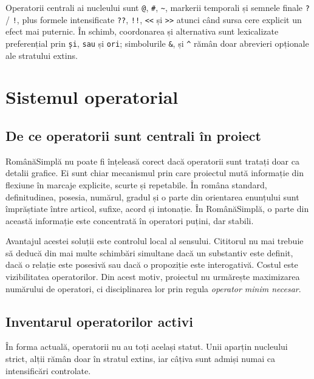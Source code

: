 \documentclass[12pt,onecolumn,letterpaper]{article}
\newcommand{\rs}[1]{\texttt{#1}}
\begin{document}
Operatorii centrali ai nucleului sunt \rs{@}, \rs{\#}, \rs{\textasciitilde{}}, markerii
temporali și semnele finale \rs{?} / \rs{!}, plus formele intensificate
\rs{??}, \rs{!!}, \rs{<<} și \rs{>>} atunci când sursa cere explicit un efect
mai puternic. În schimb, coordonarea și alternativa sunt lexicalizate
preferențial prin \rs{și}, \rs{sau} și \rs{ori}; simbolurile \rs{\&}, \rs{\textbar{}}
și \rs{\textasciicircum{}} rămân doar abrevieri opționale ale stratului extins.

\section{Sistemul operatorial}

\subsection{De ce operatorii sunt centrali în proiect}

RomânăSimplă nu poate fi înțeleasă corect dacă operatorii sunt tratați doar ca
detalii grafice. Ei sunt chiar mecanismul prin care proiectul mută informație
din flexiune în marcaje explicite, scurte și repetabile. În româna standard,
definitudinea, posesia, numărul, gradul și o parte din orientarea enunțului sunt
împrăștiate între articol, sufixe, acord și intonație. În RomânăSimplă, o parte
din această informație este concentrată în operatori puțini, dar stabili.

Avantajul acestei soluții este controlul local al sensului. Cititorul nu mai
trebuie să deducă din mai multe schimbări simultane dacă un substantiv este
definit, dacă o relație este posesivă sau dacă o propoziție este interogativă.
Costul este vizibilitatea operatorilor. Din acest motiv, proiectul nu urmărește
maximizarea numărului de operatori, ci disciplinarea lor prin regula
\textit{operator minim necesar}.

\subsection{Inventarul operatorilor activi}

În forma actuală, operatorii nu au toți același statut. Unii aparțin nucleului
strict, alții rămân doar în stratul extins, iar câțiva sunt admiși numai ca
intensificări controlate.
\end{document}
